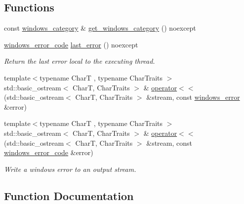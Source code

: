 \subsection*{Functions}
\begin{DoxyCompactItemize}
\item 
const \mbox{\hyperlink{classdistant_1_1error_1_1windows__category}{windows\+\_\+category}} \& \mbox{\hyperlink{namespacedistant_1_1error_a02ebc3d724cbfe0804e5d4079bb85bd4}{get\+\_\+windows\+\_\+category}} () noexcept
\item 
\mbox{\hyperlink{classdistant_1_1error_1_1windows__error__code}{windows\+\_\+error\+\_\+code}} \mbox{\hyperlink{namespacedistant_1_1error_aaaf1a34cba6373db33d2c27d8876c0b2}{last\+\_\+error}} () noexcept
\begin{DoxyCompactList}\small\item\em Return the last error local to the executing thread. \end{DoxyCompactList}\item 
{\footnotesize template$<$typename CharT , typename Char\+Traits $>$ }\\std\+::basic\+\_\+ostream$<$ CharT, Char\+Traits $>$ \& \mbox{\hyperlink{namespacedistant_1_1error_acd5106fb576fa993cc526e3c9a14ef7b}{operator$<$$<$}} (std\+::basic\+\_\+ostream$<$ CharT, Char\+Traits $>$ \&stream, const \mbox{\hyperlink{classdistant_1_1error_1_1windows__error}{windows\+\_\+error}} \&error)
\item 
{\footnotesize template$<$typename CharT , typename Char\+Traits $>$ }\\std\+::basic\+\_\+ostream$<$ CharT, Char\+Traits $>$ \& \mbox{\hyperlink{namespacedistant_1_1error_a48665acc974b937ffe1c2addb0c8777a}{operator$<$$<$}} (std\+::basic\+\_\+ostream$<$ CharT, Char\+Traits $>$ \&stream, const \mbox{\hyperlink{classdistant_1_1error_1_1windows__error__code}{windows\+\_\+error\+\_\+code}} \&error)
\begin{DoxyCompactList}\small\item\em Write a windows error to an output stream. \end{DoxyCompactList}\end{DoxyCompactItemize}


\subsection{Function Documentation}
\mbox{\label{namespacedistant_1_1error_a02ebc3d724cbfe0804e5d4079bb85bd4}} 

